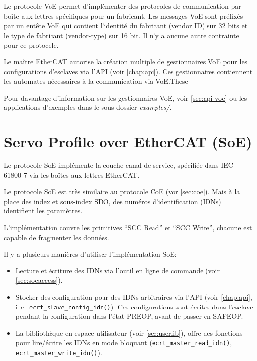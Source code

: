 \documentclass[a4paper,12pt,BCOR6mm,bibtotoc,idxtotoc]{scrbook}
\begin{document}
Le protocole VoE permet d'impl\'ementer des protocoles de communication
par bo\^ite aux lettres sp\'ecifiques pour un fabricant.  Les messages
VoE sont pr\'efix\'es par un ent\^ete VoE qui contient l'identit\'e du
fabricant (vendor ID) sur 32 bits et le type de fabricant
(vendor-type) sur 16 bit.  Il n'y a aucune autre contrainte pour ce
protocole.

Le ma\^itre EtherCAT autorise la cr\'eation multiple de gestionnaires
VoE pour les configurations d'esclaves via l'API (voir
\autoref{chap:api}).  Ces gestionnaires contiennent les automates
n\'ecessaires \`a la communication via VoE.These

Pour davantage d'information sur les gestionnaires VoE, voir
\autoref{sec:api-voe} ou les applications d'exemples dans le
sous-dossier \textit{examples/}.


\section{Servo Profile over EtherCAT (SoE)}
\label{sec:soe}

Le protocole SoE impl\'emente la couche canal de service,
sp\'ecifi\'ee dans IEC 61800-7 \cite{soespec} via les bo\^ites aux
lettres EtherCAT.

Le protocole SoE est tr\`es similaire au protocole CoE (vor
\autoref{sec:coe}). Mais \`a la place des index et sous-index SDO, des
num\'eros d'identification (IDNs) identifient les param\`etres.

L'impl\'ementation couvre les primitives ``SCC Read'' et ``SCC Write'',
chacune est capable de fragmenter les donn\'ees.

Il y a plusieurs mani\`eres d'utiliser l'impl\'ementation SoE:

\begin{itemize}

\item Lecture et \'ecriture des IDNs via l'outil en ligne de commande (voir
\autoref{sec:soeaccess}).

\item Stocker des configuration pour des IDNs arbitraires via l'API
  (voir \autoref{chap:api}, i.\,e.~\lstinline+ecrt_slave_config_idn()+).
  Ces configurations sont \'ecrites dans l'esclave pendant la configuration
  dans l'\'etat PREOP, avant de passer en SAFEOP.

\item La biblioth\`eque en espace utilisateur (voir
  \autoref{sec:userlib}), offre des fonctions pour lire/\'ecrire les
  IDNs en mode bloquant (\lstinline+ecrt_master_read_idn()+,
  \lstinline+ecrt_master_write_idn()+).

\end{itemize}
\end{document}

